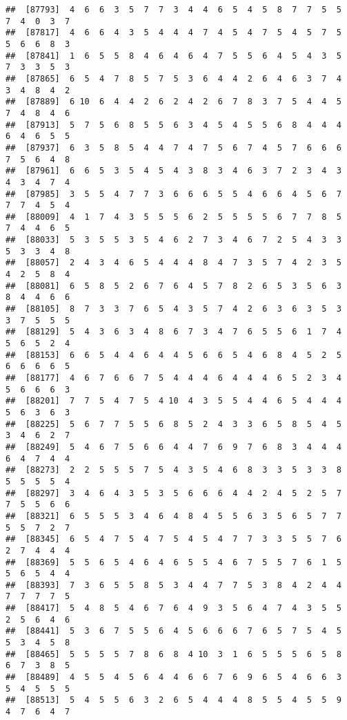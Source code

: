 \documentclass[
]{book}
\begin{document}
\begin{verbatim}
##  [87793]  4  6  6  3  5  7  7  3  4  4  6  5  4  5  8  7  7  5  5  7  4  0  3  7
##  [87817]  4  6  6  4  3  5  4  4  4  7  4  5  4  7  5  4  5  7  5  5  6  6  8  3
##  [87841]  1  6  5  5  8  4  6  4  6  4  7  5  5  6  4  5  4  3  5  7  3  3  5  3
##  [87865]  6  5  4  7  8  5  7  5  3  6  4  4  2  6  4  6  3  7  4  3  4  8  4  2
##  [87889]  6 10  6  4  4  2  6  2  4  2  6  7  8  3  7  5  4  4  5  7  4  8  4  6
##  [87913]  5  7  5  6  8  5  5  6  3  4  5  4  5  5  6  8  4  4  4  6  4  6  5  5
##  [87937]  6  3  5  8  5  4  4  7  4  7  5  6  7  4  5  7  6  6  6  7  5  6  4  8
##  [87961]  6  6  5  3  5  4  5  4  3  8  3  4  6  3  7  2  3  4  3  4  3  4  7  4
##  [87985]  3  5  5  4  7  7  3  6  6  6  5  5  4  6  6  4  5  6  7  7  7  4  5  4
##  [88009]  4  1  7  4  3  5  5  5  6  2  5  5  5  5  6  7  7  8  5  7  4  4  6  5
##  [88033]  5  3  5  5  3  5  4  6  2  7  3  4  6  7  2  5  4  3  3  5  3  3  4  8
##  [88057]  2  4  3  4  6  5  4  4  4  8  4  7  3  5  7  4  2  3  5  4  2  5  8  4
##  [88081]  6  5  8  5  2  6  7  6  4  5  7  8  2  6  5  3  5  6  3  8  4  4  6  6
##  [88105]  8  7  3  3  7  6  5  4  3  5  7  4  2  6  3  6  3  5  3  3  7  5  5  5
##  [88129]  5  4  3  6  3  4  8  6  7  3  4  7  6  5  5  6  1  7  4  5  6  5  2  4
##  [88153]  6  6  5  4  4  6  4  4  5  6  6  5  4  6  8  4  5  2  5  6  6  6  6  5
##  [88177]  4  6  7  6  6  7  5  4  4  4  6  4  4  4  6  5  2  3  4  5  6  6  6  3
##  [88201]  7  7  5  4  7  5  4 10  4  3  5  5  4  4  6  5  4  4  4  5  6  3  6  3
##  [88225]  5  6  7  7  5  5  6  8  5  2  4  3  3  6  5  8  5  4  5  3  4  6  2  7
##  [88249]  5  4  6  7  5  6  6  4  4  7  6  9  7  6  8  3  4  4  4  6  4  7  4  4
##  [88273]  2  2  5  5  5  7  5  4  3  5  4  6  8  3  3  5  3  3  8  5  5  5  5  4
##  [88297]  3  4  6  4  3  5  3  5  6  6  6  4  4  2  4  5  2  5  7  7  5  5  6  6
##  [88321]  6  5  5  5  3  4  6  4  8  4  5  5  6  3  5  6  5  7  7  5  5  7  2  7
##  [88345]  6  5  4  7  5  4  7  5  4  5  4  7  7  3  3  5  5  7  6  2  7  4  4  4
##  [88369]  5  5  6  5  4  6  4  6  5  5  4  6  7  5  5  7  6  1  5  5  6  5  4  4
##  [88393]  7  3  6  5  5  8  5  3  4  4  7  7  5  3  8  4  2  4  4  7  7  7  7  5
##  [88417]  5  4  8  5  4  6  7  6  4  9  3  5  6  4  7  4  3  5  5  2  5  6  4  6
##  [88441]  5  3  6  7  5  5  6  4  5  6  6  6  7  6  5  7  5  4  5  5  3  4  5  8
##  [88465]  5  5  5  5  7  8  6  8  4 10  3  1  6  5  5  5  6  5  8  6  7  3  8  5
##  [88489]  4  5  5  4  5  6  4  4  6  6  7  6  9  6  5  4  6  6  3  5  4  5  5  5
##  [88513]  5  4  5  5  6  3  2  6  5  4  4  4  8  5  5  4  5  5  9  4  7  6  4  7

\end{verbatim}
\end{document}
